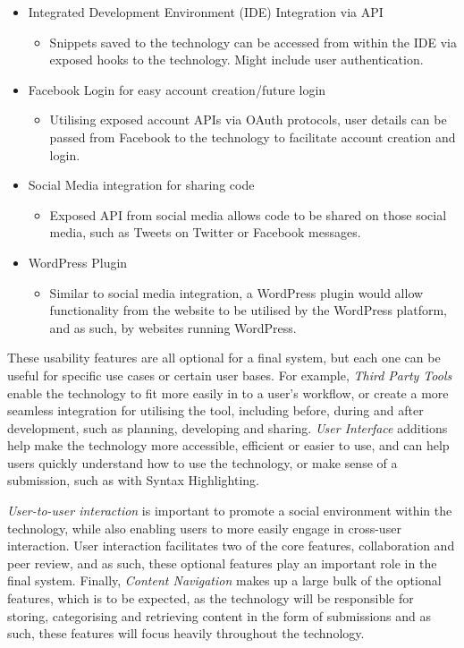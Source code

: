 \begin{itemize}
	\begin{itemize} 
		\item Integrated Development Environment (IDE) Integration via API
		\begin{itemize}
			\item Snippets saved to the technology can be accessed from within the IDE via exposed hooks to the technology. Might include user authentication.
		\end{itemize}
		\item Facebook Login for easy account creation/future login
		\begin{itemize}
			\item Utilising exposed account APIs via OAuth protocols, user details can be passed from Facebook to the technology to facilitate account creation and login.
		\end{itemize}
		\item Social Media integration for sharing code
		\begin{itemize}
			\item Exposed API from social media allows code to be shared on those social media, such as Tweets on Twitter or Facebook messages.
		\end{itemize}
		\item WordPress Plugin
		\begin{itemize}
			\item Similar to social media integration, a WordPress plugin would allow functionality from the website to be utilised by the WordPress platform, and as such, by websites running WordPress.
		\end{itemize}
	\end{itemize}
\end{itemize}

These usability features are all optional for a final system, but each one can be useful for specific use cases or certain user bases. For example, \textit{Third Party Tools} enable the technology to fit more easily in to a user's workflow, or create a more seamless integration for utilising the tool, including before, during and after development, such as planning, developing and sharing. \textit{User Interface} additions help make the technology more accessible, efficient or easier to use, and can help users quickly understand how to use the technology, or make sense of a submission, such as with Syntax Highlighting.

\textit{User-to-user interaction} is important to promote a social environment within the technology, while also enabling users to more easily engage in cross-user interaction. User interaction facilitates two of the core features, collaboration and peer review, and as such, these optional features play an important role in the final system. Finally, \textit{Content Navigation} makes up a large bulk of the optional features, which is to be expected, as the technology will be responsible for storing, categorising and retrieving content in the form of submissions and as such, these features will focus heavily throughout the technology.

